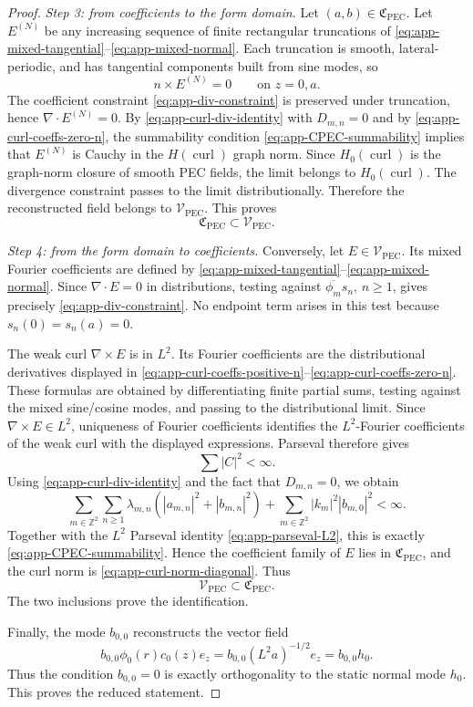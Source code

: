 \documentclass[11pt]{article}
\providecommand{\Z}{\mathbb{Z}}
\providecommand{\abs}[1]{\left\lvert #1\right\rvert}
\providecommand{\paren}[1]{\left(#1\right)}
\providecommand{\VPEC}{\mathcal V_{\mathrm{PEC}}}
\providecommand{\Hzcurl}{H_0(\operatorname{curl})}
\providecommand{\hzero}{h_0}
\numberwithin{equation}{section}
\begin{document}
\begin{proof}
\emph{Step 3: from coefficients to the form domain.}
Let \((a,b)\in\mathfrak C_{\mathrm{PEC}}\).  Let \(E^{(N)}\) be any increasing
sequence of finite rectangular truncations of
\eqref{eq:app-mixed-tangential}--\eqref{eq:app-mixed-normal}.  Each truncation is
smooth, lateral-periodic, and has tangential components built from sine modes,
so
\[
    n\times E^{(N)}=0
    \qquad\text{on }z=0,a .
\]
The coefficient constraint \eqref{eq:app-div-constraint} is preserved under
truncation, hence \(\nabla\cdot E^{(N)}=0\).  By
\eqref{eq:app-curl-div-identity} with \(D_{m,n}=0\) and by
\eqref{eq:app-curl-coeffs-zero-n}, the summability condition
\eqref{eq:app-CPEC-summability} implies that \(E^{(N)}\) is Cauchy in the
\(H(\operatorname{curl})\) graph norm.  Since \(\Hzcurl\) is the graph-norm
closure of smooth PEC fields, the limit belongs to \(\Hzcurl\).  The divergence
constraint passes to the limit distributionally.  Therefore the reconstructed
field belongs to \(\VPEC\).  This proves
\[
    \mathfrak C_{\mathrm{PEC}}\subset\VPEC .
\]

\emph{Step 4: from the form domain to coefficients.}
Conversely, let \(E\in\VPEC\).  Its mixed Fourier coefficients are defined by
\eqref{eq:app-mixed-tangential}--\eqref{eq:app-mixed-normal}.  Since
\(\nabla\cdot E=0\) in distributions, testing against
\(\overline{\phi_m}s_n\), \(n\ge1\), gives precisely
\eqref{eq:app-div-constraint}.  No endpoint term arises in this test because
\(s_n(0)=s_n(a)=0\).

The weak curl \(\nabla\times E\) is in \(L^2\).  Its Fourier coefficients are the
distributional derivatives displayed in
\eqref{eq:app-curl-coeffs-positive-n}--\eqref{eq:app-curl-coeffs-zero-n}.  These
formulas are obtained by differentiating finite partial sums, testing against
the mixed sine/cosine modes, and passing to the distributional limit.  Since
\(\nabla\times E\in L^2\), uniqueness of Fourier coefficients identifies the
\(L^2\)-Fourier coefficients of the weak curl with the displayed expressions.
Parseval
therefore gives
\[
    \sum\abs{C}^2<\infty .
\]
Using \eqref{eq:app-curl-div-identity} and the fact that
\(D_{m,n}=0\), we obtain
\[
    \sum_{m\in\Z^2}\sum_{n\ge1}
    \lambda_{m,n}
    \paren{\abs{a_{m,n}}^2+\abs{b_{m,n}}^2}
    +
    \sum_{m\in\Z^2}\abs{k_m}^2\abs{b_{m,0}}^2
    <\infty .
\]
Together with the \(L^2\) Parseval identity \eqref{eq:app-parseval-L2}, this is
exactly \eqref{eq:app-CPEC-summability}.  Hence the coefficient family of
\(E\) lies in \(\mathfrak C_{\mathrm{PEC}}\), and the curl norm is
\eqref{eq:app-curl-norm-diagonal}.  Thus
\[
    \VPEC\subset\mathfrak C_{\mathrm{PEC}} .
\]
The two inclusions prove the identification.

Finally, the mode \(b_{0,0}\) reconstructs the vector field
\[
    b_{0,0}\phi_0(r)c_0(z)e_z
    =
    b_{0,0}(L^2a)^{-1/2}e_z
    =
    b_{0,0}\hzero .
\]
Thus the condition \(b_{0,0}=0\) is exactly orthogonality to the static normal
mode \(\hzero\).  This proves the reduced statement.
\end{proof}
\end{document}
